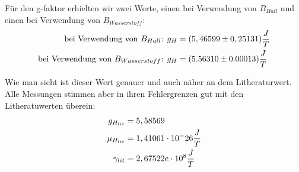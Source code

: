\documentclass[12pt]{article}
\begin{document}
Für den g-faktor erhielten wir zwei Werte, einen bei Verwendung von $B_{Hall}$ und einen bei Verwendung von $B_{Wasserstoff}$:
\begin{align}
 \notag \textnormal{bei Verwendung von $B_{Hall}$: } g_H &= (5,46599 \pm 0,25131) \frac{J}{T} \\
 \notag \textnormal{bei Verwendung von $B_{Wasserstoff}$: } g_H &=  (5.56310 \pm 0.00013) \frac{J}{T}
\end{align}

Wie man sieht ist dieser Wert genauer und auch näher an dem Litheraturwert. Alle Messungen stimmen aber in ihren Fehlergrenzen gut mit den Litheratuwerten überein:
\begin{align}
 \notag g_{H_{lit}} &= 5,58569 \\
 \notag \mu_{H_{lit}} &= 1,41061 \cdot 10^-{26} \frac{J}{T}\\
 \notag \gamma_{lit} &= 2,67522e \cdot 10^8 \frac{J}{T}
\end{align}
\end{document}
